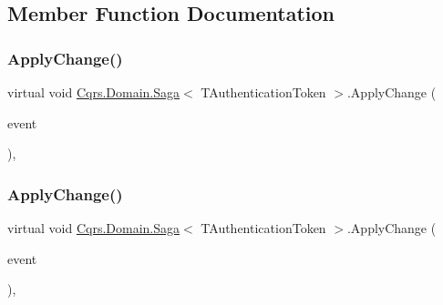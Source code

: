 \subsection{Member Function Documentation}
\mbox{\label{classCqrs_1_1Domain_1_1Saga_af8a1eddbadc8fc3fb69f18691f3b08ac}} 
\subsubsection{\texorpdfstring{Apply\+Change()}{ApplyChange()}\hspace{0.1cm}{\footnotesize\ttfamily [1/2]}}
{\footnotesize\ttfamily virtual void \hyperlink{classCqrs_1_1Domain_1_1Saga}{Cqrs.\+Domain.\+Saga}$<$ T\+Authentication\+Token $>$.Apply\+Change (\begin{DoxyParamCaption}\item[{\hyperlink{interfaceCqrs_1_1Events_1_1ISagaEvent}{I\+Saga\+Event}$<$ T\+Authentication\+Token $>$ @}]{event }\end{DoxyParamCaption})\hspace{0.3cm}{\ttfamily [protected]}, {\ttfamily [virtual]}}

\mbox{\label{classCqrs_1_1Domain_1_1Saga_a25462563492d834e297388e0648a57ac}} 
\subsubsection{\texorpdfstring{Apply\+Change()}{ApplyChange()}\hspace{0.1cm}{\footnotesize\ttfamily [2/2]}}
{\footnotesize\ttfamily virtual void \hyperlink{classCqrs_1_1Domain_1_1Saga}{Cqrs.\+Domain.\+Saga}$<$ T\+Authentication\+Token $>$.Apply\+Change (\begin{DoxyParamCaption}\item[{\hyperlink{interfaceCqrs_1_1Events_1_1IEvent}{I\+Event}$<$ T\+Authentication\+Token $>$ @}]{event }\end{DoxyParamCaption})\hspace{0.3cm}{\ttfamily [protected]}, {\ttfamily [virtual]}}

